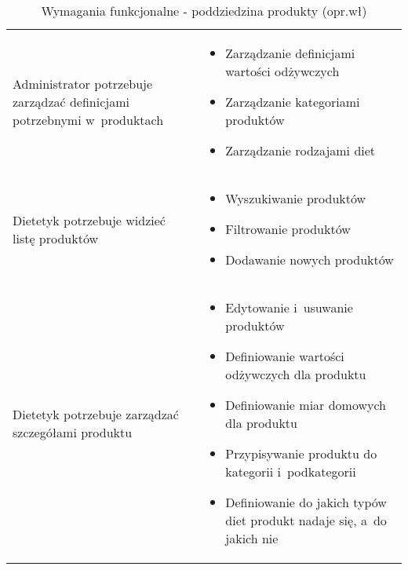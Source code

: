 \begin{minipage}{\textwidth}
    \begin{table}[H]
        \centering\caption{Wymagania funkcjonalne - poddziedzina produkty (opr.wł)\label{tabela:wymaganiaFunkcjonalneProdukty}}
        \begin{tabular}{|P{.3\textwidth}|P{.6\textwidth}|}
            \hline
             &  \\

            \hline
            Administrator potrzebuje zarządzać definicjami potrzebnymi w~produktach &
            \begin{itemize}
                \item Zarządzanie definicjami wartości odżywczych
                \item Zarządzanie kategoriami produktów
                \item Zarządzanie rodzajami diet
            \end{itemize} \\
            \hline
            Dietetyk potrzebuje widzieć listę produktów &
            \begin{itemize}
                \item Wyszukiwanie produktów
                \item Filtrowanie produktów
                \item Dodawanie nowych produktów
            \end{itemize} \\
            \hline
            Dietetyk potrzebuje zarządzać szczegółami produktu &
            \begin{itemize}
                \item Edytowanie i~usuwanie produktów
                \item Definiowanie wartości odżywczych dla produktu
                \item Definiowanie miar domowych dla produktu
                \item Przypisywanie produktu do kategorii i~podkategorii
                \item Definiowanie do jakich typów diet produkt nadaje się, a~do jakich nie
            \end{itemize} \\
            \hline
        \end{tabular}
    \end{table}
\end{minipage}

